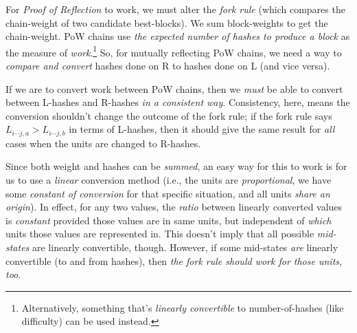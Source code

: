 

For \emph{Proof of Reflection} to work, we must alter the \emph{fork rule} (which compares the chain-weight of two candidate best-blocks).
We sum block-weights to get the chain-weight.
PoW chains use \emph{the expected number of hashes to produce a block} as the measure of \emph{work}.\footnote{
    Alternatively, something that's \emph{linearly convertible} to number-of-hashes (like difficulty) can be used instead.
}
So, for mutually reflecting PoW chains, we need a way to \emph{compare and convert} hashes done on R to hashes done on L (and vice versa).

If we are to convert work between PoW chains, then we \emph{must} be able to convert between L-hashes and R-hashes \emph{in a consistent way}.
Consistency, here, means the conversion shouldn't change the outcome of the fork rule; if the fork rule says $L_{i \cdots j,a} > L_{i \cdots j,b}$ in terms of L-hashes, then it should give the same result for \emph{all} cases when the units are changed to R-hashes.



Since both weight and hashes can be \emph{summed}, an easy way for this to work is for us to use a \emph{linear} conversion method (i.e., the units are \emph{proportional}, we have some \emph{constant of conversion} for that specific situation, and all units \emph{share an origin}).
In effect, for any two values, the \emph{ratio} between linearly converted values is \emph{constant} provided those values are in same units, but independent of \emph{which} units those values are represented in.
This doesn't imply that all possible \emph{mid-states} are linearly convertible, though.
However, if some mid-states \emph{are} linearly convertible (to and from hashes), then \emph{the fork rule should work for those units, too}.


